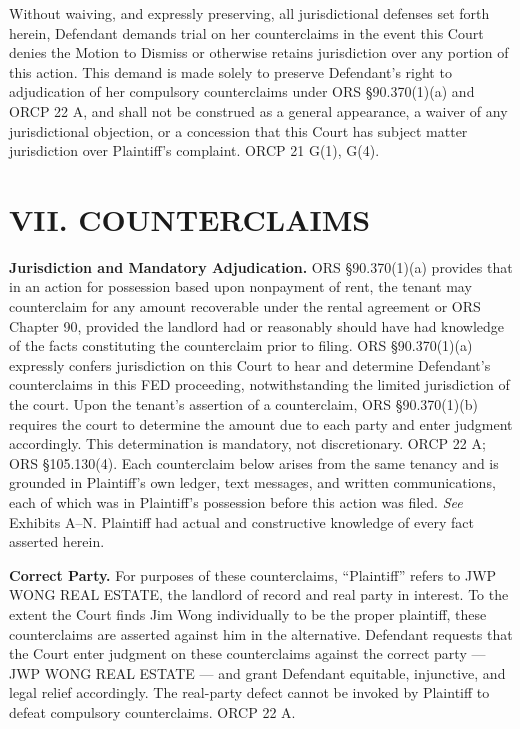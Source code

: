 \documentclass[12pt,letterpaper]{article}
\begin{document}
Without waiving, and expressly preserving, all jurisdictional defenses set forth herein, Defendant demands trial on her counterclaims in the event this Court denies the Motion to Dismiss or otherwise retains jurisdiction over any portion of this action. This demand is made solely to preserve Defendant's right to adjudication of her compulsory counterclaims under ORS \S90.370(1)(a) and ORCP 22 A, and shall not be construed as a general appearance, a waiver of any jurisdictional objection, or a concession that this Court has subject matter jurisdiction over Plaintiff's complaint. ORCP 21 G(1), G(4).

\section*{VII. COUNTERCLAIMS}

\textbf{Jurisdiction and Mandatory Adjudication.} ORS \S90.370(1)(a) provides that in an action for possession based upon nonpayment of rent, the tenant may counterclaim for any amount recoverable under the rental agreement or ORS Chapter 90, provided the landlord had or reasonably should have had knowledge of the facts constituting the counterclaim prior to filing. ORS \S90.370(1)(a) expressly confers jurisdiction on this Court to hear and determine Defendant's counterclaims in this FED proceeding, notwithstanding the limited jurisdiction of the court. Upon the tenant's assertion of a counterclaim, ORS \S90.370(1)(b) requires the court to determine the amount due to each party and enter judgment accordingly. This determination is mandatory, not discretionary. ORCP 22 A; ORS \S105.130(4). Each counterclaim below arises from the same tenancy and is grounded in Plaintiff's own ledger, text messages, and written communications, each of which was in Plaintiff's possession before this action was filed. \textit{See} Exhibits A--N. Plaintiff had actual and constructive knowledge of every fact asserted herein.

\textbf{Correct Party.} For purposes of these counterclaims, ``Plaintiff'' refers to JWP WONG REAL ESTATE, the landlord of record and real party in interest. To the extent the Court finds Jim Wong individually to be the proper plaintiff, these counterclaims are asserted against him in the alternative. Defendant requests that the Court enter judgment on these counterclaims against the correct party --- JWP WONG REAL ESTATE --- and grant Defendant equitable, injunctive, and legal relief accordingly. The real-party defect cannot be invoked by Plaintiff to defeat compulsory counterclaims. ORCP 22 A.
\end{document}
